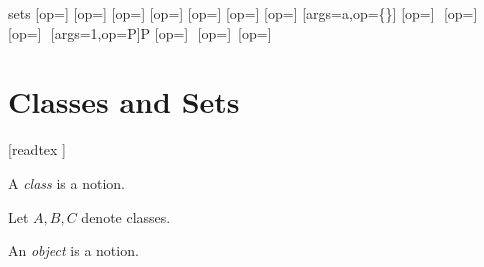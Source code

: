 \documentclass{article}
\begin{document}
\begin{smodule}{sets}
\STEXexport{
  \let\oldsubseteq\subseteq
  \let\subseteq\relax
  \let\oldsubset\subset
  \let\subset\relax
  \let\oldsupseteq\supseteq
  \let\supseteq\relax
  \let\oldsupset\supset
  \let\supset\relax
  \let\oldsubsetneq\subsetneq
  \let\subsetneq\relax
  \let\oldsupsetneq\supsetneq
  \let\supsetneq\relax
  \let\oldemptyset\emptyset
  \let\emptyset\relax
  \let\oldcup\cup
  \let\cup\relax
  \let\oldcap\cap
  \let\cap\relax
  \let\oldsetminus\setminus
  \let\setminus\relax
  \let\oldtimes\times
  \let\times\relax
  \let\oldbigcup\bigcup
  \let\bigcup\relax
  \let\oldbigcap\bigcap
  \let\bigcap\relax
}
[op=\oldsubseteq]{\;\oldsubseteq\;}
[op=\oldsubset]{\;\oldsubset\;}
[op=\oldsupseteq]{\;\oldsupseteq\;}
[op=\oldsupset]{\;\oldsupset\;}
[op=\oldsubsetneq]{\;\oldsubsetneq\;}
[op=\oldsupsetneq]{\;\oldsupsetneq\;}
[op=\oldemptyset]{\oldemptyset}
[args=a,op=\{\cdot\}]{\comp{\{}\comp{\}}}
[op=\oldcup]{\,\oldcup\,}
[op=\oldcap]{\,\oldcap\,}
[op=\oldsetminus]{\,\oldsetminus\,}
[args=1,op=\mathcal P]{\mathcal P}
[op=\oldtimes]{\,\oldtimes\,}
[op=\oldbigcup]{\oldbigcup\,}
[op=\oldbigcap]{\oldbigcap\,}

\section{Classes and Sets}

\begin{forthel}

  [readtex ]
\end{forthel}

\begin{signature*}
  A \emph{class} is a notion.
\end{signature*}

\begin{forthel}
  Let $A,B,C$ denote classes.
\end{forthel}

\begin{signature*}
  An \emph{object} is a notion.
\end{signature*}


\end{smodule}
\end{document}
